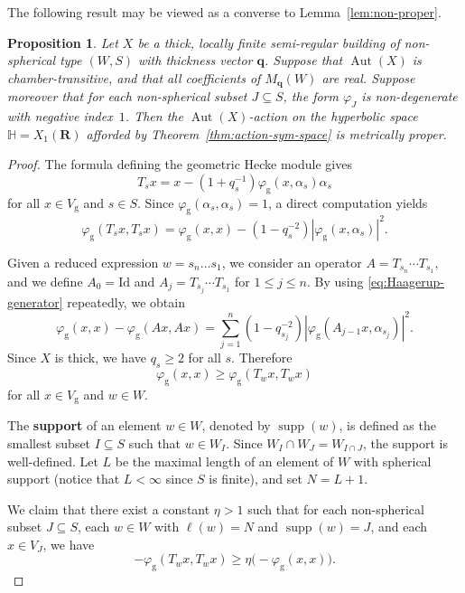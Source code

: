 \documentclass[12pt,a4paper]{amsproc}
\newtheorem{proposition}[theorem]{Proposition}
\theoremstyle{definition}
\DeclareMathOperator{\Aut}{Aut}
\DeclareMathOperator{\supp}{supp}
\newcommand{\RR}{\mathbf R}
\newcommand{\qq}{\mathbf q}
\newcommand{\rg}{\mathrm g}
\begin{document}
The following result may be viewed as a converse to Lemma~\ref{lem:non-proper}. 

\begin{proposition}\label{prop:proper}
Let $X$ be a thick, locally finite semi-regular building of non-spherical type $(W, S)$ with thickness vector $\qq$.  Suppose that $\Aut(X)$ is chamber-transitive,  and that all coefficients of $M_\qq(W)$ are real.
Suppose moreover that for each  non-spherical subset $J \subseteq S$, the form $\varphi_J$ is non-degenerate with negative index~$1$. Then the $\Aut(X)$-action on the hyperbolic space $\mathbb H  = X_1(\RR)$ afforded by Theorem~\ref{thm:action-sym-space} is metrically proper. 
\end{proposition}
\begin{proof}
The formula defining the geometric Hecke module gives
$$
T_sx=x-(1+q_s^{-1})\varphi_\rg(x,\alpha_s)\alpha_s
$$
for all $x \in V_\rg$ and $s \in S$. 
Since $\varphi_\rg(\alpha_s,\alpha_s)=1$, a direct computation
yields
\begin{equation}\label{eq:Haagerup-generator}
\varphi_\rg(T_sx,T_sx)
=
\varphi_\rg(x,x)
-(1-q_s^{-2})|\varphi_\rg(x,\alpha_s)|^2.
\end{equation}

Given a reduced expression $w = s_n \dots s_1$, we consider an operator
$A=T_{s_n}\cdots T_{s_1}$, and  we define  $A_0=\mathrm{Id}$ and $A_j=T_{s_j}\cdots T_{s_1}$ for
$1\leq j\leq n$. By using  
\eqref{eq:Haagerup-generator} repeatedly, we obtain
\begin{equation}\label{eq:Haagerup-block}
\varphi_\rg(x,x)-\varphi_\rg(Ax,Ax)
=\sum_{j=1}^{n}(1-q_{s_j}^{-2})
  |\varphi_\rg(A_{j-1}x,\alpha_{s_j})|^2.
\end{equation}
Since $X$ is thick, we have $q_s \geq 2$ for all $s$. Therefore
\begin{equation}\label{eq:basic}
\varphi_\rg(x,x) \geq \varphi_\rg(T_w x,T_w x)  
\end{equation}
for all $x \in V_\rg$ and $w \in W$. 





The \textbf{support} of an element $w \in W$, denoted by $\supp(w)$, is defined as the smallest subset $I \subseteq S$ such that $w \in W_I$. Since $W_I \cap W_J = W_{I \cap J}$, the support is well-defined. Let $L$ be the maximal length of an element of $W$ with spherical support (notice that $L < \infty$ since $S$ is finite), and  set $N = L+1$. 

\medskip
We claim that there exist a constant $\eta > 1$ such that for each non-spherical subset $J \subseteq S$, each $w \in W$ with $\ell(w)=N$ and $\supp(w) = J$, and each $x \in V_J$, we have 
$$-\varphi_\rg(T_w x,T_wx)
\geq \eta\bigl(-\varphi_\rg(x,x)\bigr).$$


\end{proof}
\end{document}

